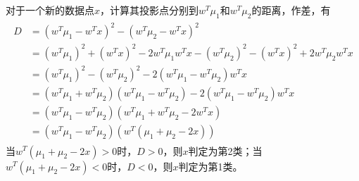 对于一个新的数据点$x$，计算其投影点分别到$w^T\mu_1$和$w^T\mu_2$的距离，作差，有
\begin{eqnarray}
\begin{aligned}
D&=(w^T\mu_1-w^Tx)^2-(w^T\mu_2-w^Tx)^2\\
&=(w^T\mu_1)^2+(w^Tx)^2-2w^T\mu_1w^Tx-(w^T\mu_2)^2-(w^Tx)^2+2w^T\mu_2w^Tx\\
&=(w^T\mu_1)^2-(w^T\mu_2)^2-2(w^T\mu_1-w^T\mu_2)w^Tx\\
&=(w^T\mu_1+w^T\mu_2)(w^T\mu_1-w^T\mu_2)-2(w^T\mu_1-w^T\mu_2)w^Tx\\
&=(w^T\mu_1-w^T\mu_2)(w^T\mu_1+w^T\mu_2-2w^Tx)\\
&=(w^T\mu_1-w^T\mu_2)(w^T(\mu_1+\mu_2-2x))
\end{aligned}
\end{eqnarray}
当$w^T(\mu_1+\mu_2-2x)>0$时，$D>0$，则$x$判定为第2类；当$w^T(\mu_1+\mu_2-2x)<0$时，$D<0$，则$x$判定为第1类。